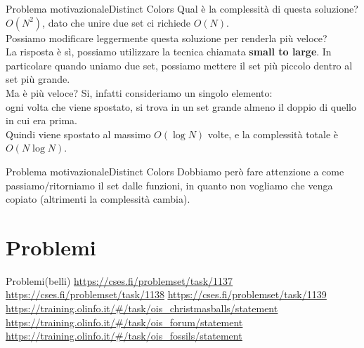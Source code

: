 \documentclass[compress]{beamer}
\begin{document}
\begin{frame}{Problema motivazionale}{Distinct Colors}
    Qual \`e la complessit\`a di questa soluzione? $O(N^2)$, dato che unire due set ci richiede $O(N)$.\\
    \pause
    Possiamo modificare leggermente questa soluzione per renderla più veloce?\\
    \pause
    La risposta \`e s\`i, possiamo utilizzare la tecnica chiamata \textbf{small to large}.
    In particolare quando uniamo due set, possiamo mettere il set più piccolo dentro al set più grande.\\
    \pause
    Ma è più veloce? Si, infatti consideriamo un singolo elemento:\\
    ogni volta che viene spostato, si trova in un set grande almeno il doppio di quello in cui era prima.\\
    \pause
    Quindi viene spostato al massimo $O(\log N)$ volte, e la complessità totale è $O(N \log N)$.
\end{frame}

\begin{frame}{Problema motivazionale}{Distinct Colors}
    Dobbiamo però fare attenzione a come passiamo/ritorniamo il set dalle funzioni, in quanto non vogliamo che venga copiato (altrimenti la complessità cambia).
\end{frame}

\section{Problemi}
\begin{frame}{Problemi}{(belli)}
    \small{\underline{\url{https://cses.fi/problemset/task/1137}}}
    \small{\underline{\url{https://cses.fi/problemset/task/1138}}}
    \small{\underline{\url{https://cses.fi/problemset/task/1139}}}
    \small{\underline{\url{https://training.olinfo.it/\#/task/ois_christmasballs/statement}}}
    \small{\underline{\url{https://training.olinfo.it/\#/task/ois_forum/statement}}}
    \small{\underline{\url{https://training.olinfo.it/\#/task/ois_fossils/statement}}}
\end{frame}
\end{document}
